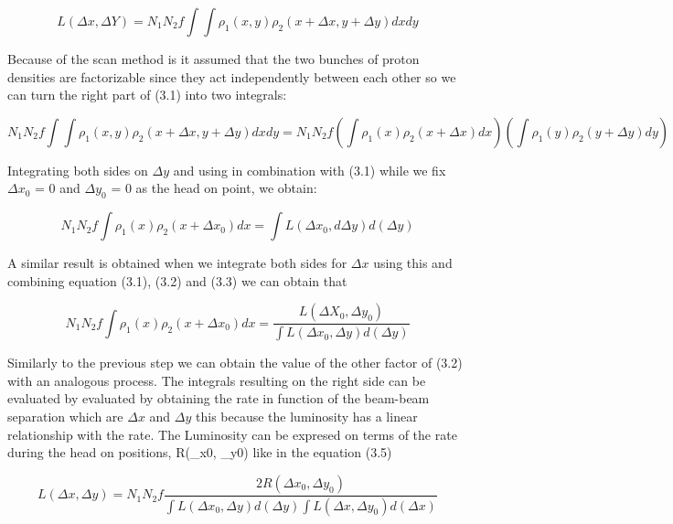 \begin{equation}
 L(\Delta x, \Delta Y) = N_{1} N_{2} f  \int \int \rho_{1}(x,y)\rho_{2}(x+\Delta x, y+\Delta y) dxdy 
\end{equation}

Because of the scan method is it assumed that the two bunches of proton densities are factorizable since they act independently between each other so we can turn the right part of (3.1) into two integrals:

 \begin{equation}
N_{1} N_{2} f  \int \int \rho_{1}(x,y)\rho_{2}(x+\Delta x, y+\Delta y) dxdy   = N_{1} N_{2} f (\int \rho_{1}(x)\rho_{2}(x + \Delta x) dx) (\int \rho_{1}(y) \rho_{2}(y + \Delta y) dy)
\end{equation}

Integrating both sides on $\Delta y$ and using in combination with (3.1) while we fix $\Delta x_{0}$ = 0 and $\Delta y_{0}$ = 0 as the head on point,  we obtain:
 
 \begin{equation}
N_{1} N_{2} f \int \rho_{1}(x) \rho_{2}(x + \Delta x_{0}) dx = \int L (\Delta x_{0}, d\Delta y) d(\Delta y)
\end{equation}

A similar result is obtained when we integrate both sides for $\Delta x$ using this and combining equation (3.1), (3.2) and (3.3) we can obtain that 

\begin{equation}
N_{1} N_{2} f \int \rho_{1}(x) \rho_{2}(x + \Delta x_{0}) dx = \frac{L (\Delta X_{0}, \Delta y_{0})}{\int L(\Delta x_{0}, \Delta y) d(\Delta y)}
\end{equation}

Similarly to the previous step we can obtain the value of the other factor of (3.2) with an analogous process. The integrals resulting on the right side can be evaluated by evaluated by obtaining the rate in function of the beam-beam separation which are $\Delta x$ and $\Delta y$  this because the luminosity has a linear relationship with the rate. The Luminosity can be expresed on terms of the rate during the head on positions, R(\Delta_{x0}, \Delta_{y0}) like in the equation (3.5)

\begin{equation}
L(\Delta x, \Delta y) = N_{1} N_{2} f \frac{2R(\Delta x_{0}, \Delta y_{0})}{\int L(\Delta x_{0}, \Delta y) d(\Delta y) \int L(\Delta x, \Delta y_{0}) d(\Delta x)}
\end{equation}

